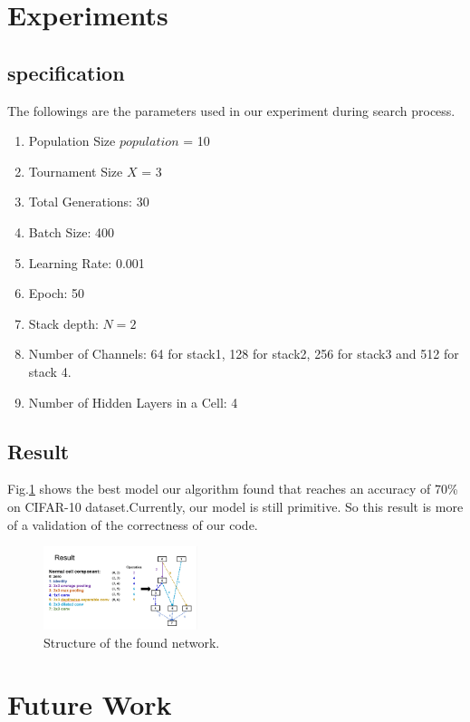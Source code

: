 \documentclass[conference]{IEEEtran}
\begin{document}
 \section{Experiments}

 \subsection{specification}
 The followings are the parameters used in our experiment during search process.
 \begin{enumerate}
  \item Population Size $population$ = 10
  \item Tournament Size $X$ = 3
  \item Total Generations: 30
  \item Batch Size: 400
  \item Learning Rate: 0.001
  \item Epoch: 50
  \item Stack depth: $N = 2$
  \item Number of Channels: 64 for stack1, 128 for stack2, 256 for stack3 and 512 for stack 4.
  \item Number of Hidden Layers in a Cell: 4
 \end{enumerate}

 \subsection{Result}

 Fig.\ref{found_artc} shows the best model our algorithm found that reaches an accuracy of 70\% on CIFAR-10 dataset.Currently, our model is still primitive. So this result is more of a validation of the correctness of our code.

\begin{figure}[H]
 	\centering
 	\includegraphics[width=0.4\textwidth]{figures/result.png}
   \caption{Structure of the found network. }\label{fig:digit}
   \label{found_artc}
  \end{figure}

  

 \section{Future Work}  
\end{document}
